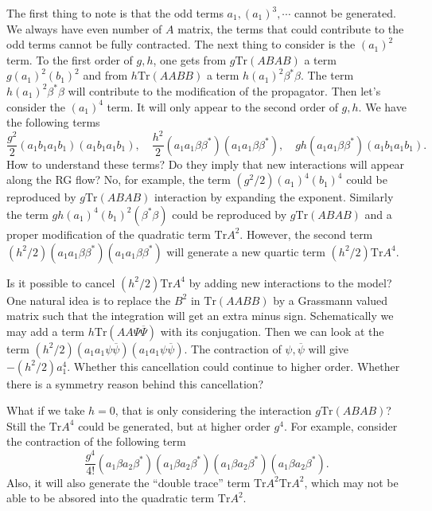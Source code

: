 The first thing to note is that the odd terms $a_1,(a_1)^3,\cdots$ cannot be generated.
We always have even number of $A$ matrix, the terms that could contribute to the odd terms cannot be fully contracted.
The next thing to consider is the $(a_1)^2$ term.
To the first order of $g,h$, one gets from $g\mathrm{Tr}(ABAB)$ a term $g (a_1)^2 (b_1)^2$ and from $h\mathrm{Tr}(AABB)$ a term $h(a_1)^2 \beta^* \beta$.
The term $h (a_1)^2 \beta^* \beta$ will contribute to the modification of the propagator.
Then let's consider the $(a_1)^4$ term.
It will only appear to the second order of $g,h$.
We have the following terms
\[
	\frac{g^2}{2} (a_1 b_1 a_1 b_1)(a_1 b_1 a_1 b_1),\quad \frac{h^2}{2} (a_1 a_1 \beta \beta^*)(a_1 a_1 \beta \beta^*),\quad gh(a_1 a_1 \beta \beta^*)(a_1 b_1 a_1 b_1) 
.\] 
How to understand these terms?
Do they imply that new interactions will appear along the RG flow?
No, for example, the term $(g^2/2) (a_1)^4 (b_1)^4$ could be reproduced by $g \mathrm{Tr}(ABAB)$ interaction by expanding the exponent.
Similarly the term $ gh (a_1)^4 (b_1)^2 (\beta^* \beta)$ could be reproduced by $ g \mathrm{Tr}(ABAB)$ and a proper modification of the quadratic term $ \mathrm{Tr}A^2$.
However, the second term $ (h^2 / 2) (a_1 a_1 \beta \beta^*) (a_1 a_1 \beta \beta^*) $ will generate a new quartic term $(h^2 / 2)\mathrm{Tr}A^4$.

Is it possible to cancel $ ( h^2 / 2) \mathrm{Tr} A^4$ by adding new interactions to the model?
One natural idea is to replace the $B^2$ in $ \mathrm{Tr}(AABB) $ by a Grassmann valued matrix such that the integration will get an extra minus sign.
Schematically we may add a term $h\mathrm{Tr}(AA\Psi \overline{\Psi})$ with its conjugation. 
Then we can look at the term $ (h^2 / 2) (a_1 a_1 \psi \overline{\psi}) (a_1 a_1 \psi \overline{\psi})$.
The contraction of $\psi,\overline{\psi}$ will give $ - (h^2 /2) a_1^4 $.
Whether this cancellation could continue to higher order.
Whether there is a symmetry reason behind this cancellation?

What if we take $h=0$, that is only considering the interaction $ g \mathrm{Tr}(ABAB)$?
Still the $\mathrm{Tr}A^4$ could be generated, but at higher order $g^4$.
For example, consider the contraction of the following term
\[
	\frac{g^4}{4!}(a_1 \beta a_2 \beta^*)(a_1 \beta a_2 \beta^*)(a_1 \beta a_2 \beta^*)(a_1 \beta a_2 \beta^*)
.\] 
Also, it will also generate the ``double trace'' term $ \mathrm{Tr}A^2 \mathrm{Tr}A^2$, which may not be able to be absored into the quadratic term $\mathrm{Tr}A^2$.
